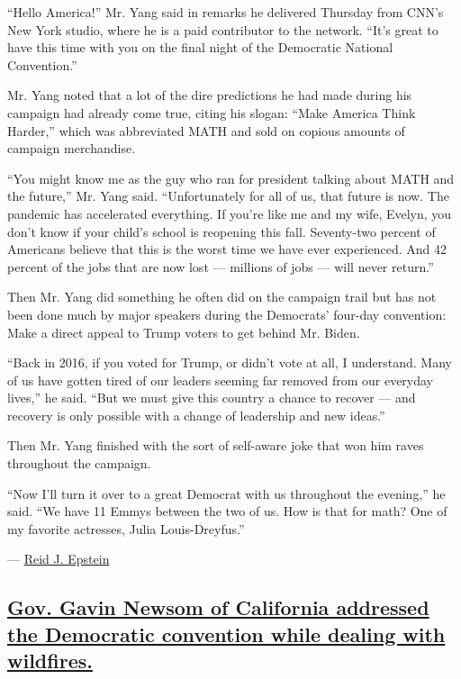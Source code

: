 ``Hello America!'' Mr. Yang said in remarks he delivered Thursday from
CNN's New York studio, where he is a paid contributor to the network.
``It's great to have this time with you on the final night of the
Democratic National Convention.''

Mr. Yang noted that a lot of the dire predictions he had made during his
campaign had already come true, citing his slogan: ``Make America Think
Harder,'' which was abbreviated MATH and sold on copious amounts of
campaign merchandise.

``You might know me as the guy who ran for president talking about MATH
and the future,'' Mr. Yang said. ``Unfortunately for all of us, that
future is now. The pandemic has accelerated everything. If you're like
me and my wife, Evelyn, you don't know if your child's school is
reopening this fall. Seventy-two percent of Americans believe that this
is the worst time we have ever experienced. And 42 percent of the jobs
that are now lost --- millions of jobs --- will never return.''

Then Mr. Yang did something he often did on the campaign trail but has
not been done much by major speakers during the Democrats' four-day
convention: Make a direct appeal to Trump voters to get behind Mr.
Biden.

``Back in 2016, if you voted for Trump, or didn't vote at all, I
understand. Many of us have gotten tired of our leaders seeming far
removed from our everyday lives,'' he said. ``But we must give this
country a chance to recover --- and recovery is only possible with a
change of leadership and new ideas.''

Then Mr. Yang finished with the sort of self-aware joke that won him
raves throughout the campaign.

``Now I'll turn it over to a great Democrat with us throughout the
evening,'' he said. ``We have 11 Emmys between the two of us. How is
that for math? One of my favorite actresses, Julia Louis-Dreyfus.''

--- \href{https://www.nytimes3xbfgragh.onion/by/reid-j-epstein}{Reid J.
Epstein}

\hypertarget{gov-gavin-newsom-of-california-addressed-the-democratic-convention-while-dealing-with-wildfires}{%
\subsection{\texorpdfstring{\protect\hyperlink{gov-gavin-newsom-of-california-addressed-the-democratic-convention-while-dealing-with-wildfires}{Gov.
Gavin Newsom of California addressed the Democratic convention while
dealing with
wildfires.}}{Gov. Gavin Newsom of California addressed the Democratic convention while dealing with wildfires.}}\label{gov-gavin-newsom-of-california-addressed-the-democratic-convention-while-dealing-with-wildfires}}

